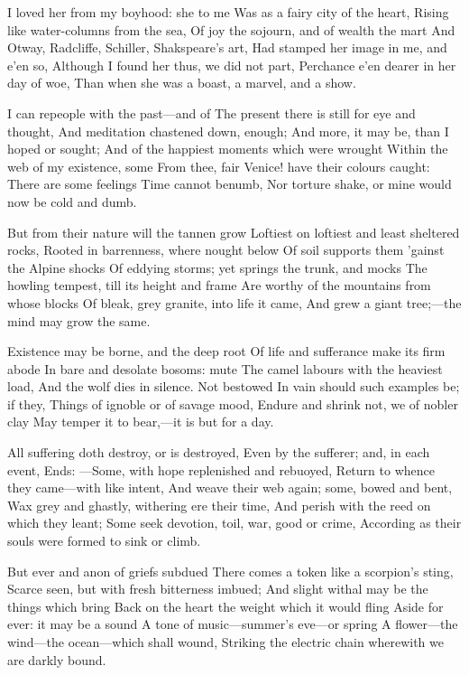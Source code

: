\documentclass[10pt,twocolumn]{book}
\begin{document}
   I loved her from my boyhood:  she to me
   Was as a fairy city of the heart,
   Rising like water-columns from the sea,
   Of joy the sojourn, and of wealth the mart
   And Otway, Radcliffe, Schiller, Shakspeare's art,
   Had stamped her image in me, and e'en so,
   Although I found her thus, we did not part,
   Perchance e'en dearer in her day of woe,
Than when she was a boast, a marvel, and a show.


   I can repeople with the past---and of
   The present there is still for eye and thought,
   And meditation chastened down, enough;
   And more, it may be, than I hoped or sought;
   And of the happiest moments which were wrought
   Within the web of my existence, some
   From thee, fair Venice! have their colours caught:
   There are some feelings Time cannot benumb,
Nor torture shake, or mine would now be cold and dumb.


   But from their nature will the tannen grow
   Loftiest on loftiest and least sheltered rocks,
   Rooted in barrenness, where nought below
   Of soil supports them 'gainst the Alpine shocks
   Of eddying storms; yet springs the trunk, and mocks
   The howling tempest, till its height and frame
   Are worthy of the mountains from whose blocks
   Of bleak, grey granite, into life it came,
And grew a giant tree;---the mind may grow the same.


   Existence may be borne, and the deep root
   Of life and sufferance make its firm abode
   In bare and desolate bosoms:  mute
   The camel labours with the heaviest load,
   And the wolf dies in silence.  Not bestowed
   In vain should such examples be; if they,
   Things of ignoble or of savage mood,
   Endure and shrink not, we of nobler clay
May temper it to bear,---it is but for a day.


   All suffering doth destroy, or is destroyed,
   Even by the sufferer; and, in each event,
   Ends: ---Some, with hope replenished and rebuoyed,
   Return to whence they came---with like intent,
   And weave their web again; some, bowed and bent,
   Wax grey and ghastly, withering ere their time,
   And perish with the reed on which they leant;
   Some seek devotion, toil, war, good or crime,
According as their souls were formed to sink or climb.


   But ever and anon of griefs subdued
   There comes a token like a scorpion's sting,
   Scarce seen, but with fresh bitterness imbued;
   And slight withal may be the things which bring
   Back on the heart the weight which it would fling
   Aside for ever:  it may be a sound\textemdash
   A tone of music---summer's eve---or spring\textemdash
   A flower---the wind---the ocean---which shall wound,
Striking the electric chain wherewith we are darkly bound.
\end{document}
